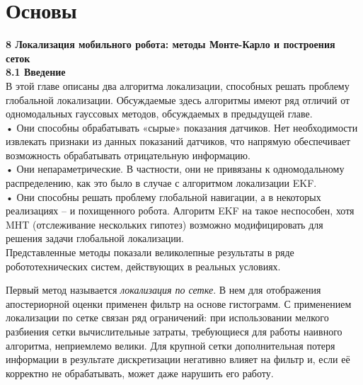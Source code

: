 \documentclass[10pt,a4paper]{article}
\begin{document}
\part{Основы}



\textbf{8 Локализация мобильного робота: методы Монте-Карло и построения сеток}\\

\textbf{8.1	Введение}\\

В этой главе описаны два алгоритма локализации, способных решать проблему глобальной локализации. Обсуждаемые здесь алгоритмы имеют ряд отличий от одномодальных гауссовых методов, обсуждаемых в предыдущей главе. \\

•	Они способны обрабатывать «сырые» показания датчиков. Нет необходимости извлекать признаки из данных показаний датчиков, что напрямую обеспечивает возможность обрабатывать отрицательную информацию. \\

•	Они непараметрические. В частности, они не привязаны к одномодальному распределению, как это было в случае с алгоритмом локализации EKF.\\

•	Они способны решать проблему глобальной навигации, а в некоторых реализациях – и похищенного робота. Алгоритм EKF на такое неспособен, хотя MHT (отслеживание нескольких гипотез) возможно модифицировать для решения задачи глобальной локализации.\\

Представленные методы показали великолепные результаты в ряде робототехнических систем, действующих в реальных условиях. 

Первый метод называется \textit{локализация по сетке}. В нем для отображения апостериорной оценки применен фильтр на основе гистограмм. С применением локализации по сетке связан ряд ограничений: при использовании мелкого разбиения сетки  вычислительные затраты, требующиеся для работы наивного алгоритма, неприемлемо велики. Для крупной сетки дополнительная потеря информации в результате дискретизации негативно влияет на фильтр и, если её корректно не обрабатывать, может даже нарушить его работу. 
\end{document}

